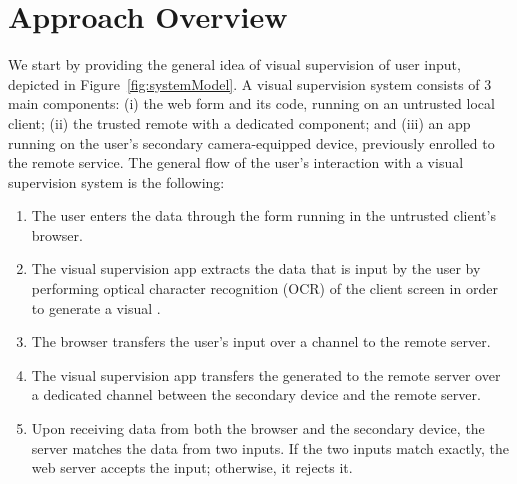 \section{Approach Overview}
\label{untegriscreen:sec:systemDesign}





We start by providing the general idea of visual supervision of user input, depicted in Figure~\ref{fig:systemModel}.
A visual supervision system consists of 3 main components: (i) the web form and its code, running on an untrusted local client; (ii) the trusted remote \server with a dedicated component; and (iii) an app running on the user's secondary camera-equipped device, previously enrolled to the remote service. The general flow of the user's interaction with a visual supervision system is the following:

\begin{enumerate}
  \item[\one] The user enters the data through the form running in the untrusted client's browser.

  \item[\two] The visual supervision app extracts the data that is input by the user by performing optical character recognition (OCR) of the client screen in order to generate a visual \textit{\POI}.

  \item[\three] The browser transfers the user's input over a \https channel to the remote server.

  \item[\four] The visual supervision app transfers the generated \POI to the remote server over a dedicated \tls channel between the secondary device and the remote server.

  \item[\five] Upon receiving data from both the browser and the secondary device, the server matches the data from two inputs.
  If the two inputs match exactly, the web server accepts the input; otherwise, it rejects it.
\end{enumerate}



